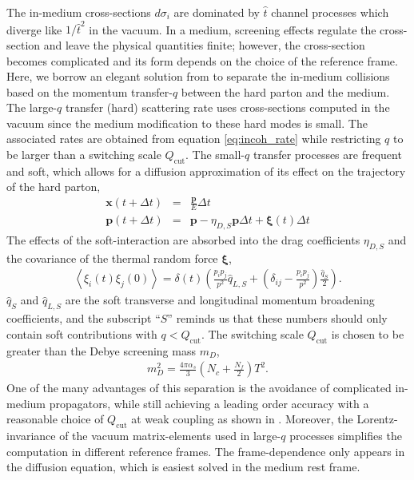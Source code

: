 \documentclass[aps, prc, reprint, amsmath, groupedaddress, nofootinbib]{revtex4-1}
\begin{document}
The in-medium cross-sections $d\sigma_i$ are dominated by $\hat{t}$ channel processes which diverge like $1/\hat{t}^2$ in the vacuum.
In a medium, screening effects regulate the cross-section and leave the physical quantities finite; however, the cross-section becomes complicated and its form depends on the choice of the reference frame.
Here, we borrow an elegant solution from \cite{Ghiglieri:2015ala} to separate the in-medium collisions based on the momentum transfer-$q$ between the hard parton and the medium.
The large-$q$ transfer (hard) scattering rate uses cross-sections computed in the vacuum since the medium modification to these hard modes is small.
The associated rates are obtained from equation \ref{eq:incoh_rate} while restricting $q$ to be larger than a switching scale $Q_{\textrm{cut}}$.
The small-$q$ transfer processes are frequent and soft, which allows for a diffusion approximation of its effect on the trajectory of the hard parton,
\begin{eqnarray}
\mathbf{x}(t+\Delta t) &=& \frac{\mathbf{p}}{E}\Delta t\\
\mathbf{p}(t+\Delta t) &=& \mathbf{p} - \eta_{D,S} \mathbf{p} \Delta t + \mathbf{\xi}(t) \Delta t
\end{eqnarray}
The effects of the soft-interaction are absorbed into the drag coefficients $\eta_{D,S}$ and the covariance of the thermal random force $\mathbf{\xi}$,
\begin{eqnarray}
\left\langle\xi_i(t)\xi_j(0)\right\rangle = \delta(t) \left(
\frac{p_i p_j}{p^2}\hat{q}_{L,S} + \left(
\delta_{ij}-\frac{p_i p_j}{p^2}
\right)\frac{\hat{q}_S}{2} 
\right).
\end{eqnarray}
$\hat{q}_S$ and $\hat{q}_{L,S}$ are the soft transverse and longitudinal momentum broadening coefficients, and the subscript ``$S$'' reminds us that these numbers should only contain soft contributions with $q<Q_{\textrm{cut}}$.
The switching scale $Q_{\textrm{cut}}$ is chosen to be greater than the Debye screening mass $m_D$,
\begin{eqnarray}
m_D^2 = \frac{4\pi \alpha_s}{3}\left(N_c+\frac{N_f}{2}\right) T^2.
\end{eqnarray}
One of the many advantages of this separation is the avoidance of complicated in-medium propagators, while still achieving a leading order accuracy with a reasonable choice of $Q_{\textrm{cut}}$ at weak coupling as shown in \cite{Ghiglieri:2015ala}.
Moreover, the Lorentz-invariance of the vacuum matrix-elements used in large-$q$ processes simplifies the computation in different reference frames. The frame-dependence only appears in the diffusion equation, which is easiest solved in the medium rest frame.
\end{document}
